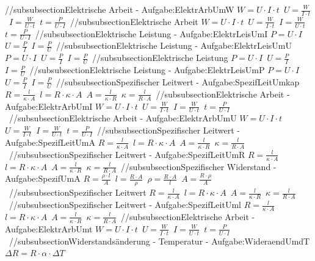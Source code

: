 //subsubsection{Elektrische Arbeit - Aufgabe:ElektrArbUmW} 
$ W = U\cdot I\cdot t $\ 
$ U = \frac{W}{I\cdot t} $\ 
$ I = \frac{W}{U\cdot t} $\ 
$ t = \frac{ P}{U\cdot I} $\ 
//subsubsection{Elektrische Arbeit} 
$ W = U\cdot I\cdot t $\ 
$ U = \frac{W}{I\cdot t} $\ 
$ I = \frac{W}{U\cdot t} $\ 
$ t = \frac{ P}{U\cdot I} $\ 
//subsubsection{Elektrische Leistung - Aufgabe:ElektrLeisUmI} 
$ P = U\cdot I $\ 
$ U = \frac{P}{I} $\ 
$ I = \frac{P}{U} $\ 
//subsubsection{Elektrische Leistung - Aufgabe:ElektrLeisUmU} 
$ P = U\cdot I $\ 
$ U = \frac{P}{I} $\ 
$ I = \frac{P}{U} $\ 
//subsubsection{Elektrische Leistung} 
$ P = U\cdot I $\ 
$ U = \frac{P}{I} $\ 
$ I = \frac{P}{U} $\ 
//subsubsection{Elektrische Leistung - Aufgabe:ElektrLeisUmP} 
$ P = U\cdot I $\ 
$ U = \frac{P}{I} $\ 
$ I = \frac{P}{U} $\ 
//subsubsection{Spezifischer Leitwert - Aufgabe:SpezifLeitUmkap} 
$ R = \frac{ l}{\kappa \cdot A} $\ 
$ l = R\cdot \kappa \cdot A $\ 
$ A = \frac{l}{\kappa \cdot R} $\ 
$ \kappa  = \frac{ l}{R\cdot A} $\ 
//subsubsection{Elektrische Arbeit - Aufgabe:ElektrArbUmI} 
$ W = U\cdot I\cdot t $\ 
$ U = \frac{W}{I\cdot t} $\ 
$ I = \frac{W}{U\cdot t} $\ 
$ t = \frac{ P}{U\cdot I} $\ 
//subsubsection{Elektrische Arbeit - Aufgabe:ElektrArbUmU} 
$ W = U\cdot I\cdot t $\ 
$ U = \frac{W}{I\cdot t} $\ 
$ I = \frac{W}{U\cdot t} $\ 
$ t = \frac{ P}{U\cdot I} $\ 
//subsubsection{Spezifischer Leitwert - Aufgabe:SpezifLeitUmA} 
$ R = \frac{ l}{\kappa \cdot A} $\ 
$ l = R\cdot \kappa \cdot A $\ 
$ A = \frac{l}{\kappa \cdot R} $\ 
$ \kappa  = \frac{ l}{R\cdot A} $\ 
//subsubsection{Spezifischer Leitwert - Aufgabe:SpezifLeitUmR} 
$ R = \frac{ l}{\kappa \cdot A} $\ 
$ l = R\cdot \kappa \cdot A $\ 
$ A = \frac{l}{\kappa \cdot R} $\ 
$ \kappa  = \frac{ l}{R\cdot A} $\ 
//subsubsection{Spezifischer Widerstand - Aufgabe:SpezifUmA} 
$ R = \frac{\rho \cdot l}{ A} $\ 
$ l = \frac{R\cdot A}{ \rho } $\ 
$ \rho  = \frac{R\cdot A}{ l} $\ 
$ A = \frac{R\cdot \rho }{ A} $\ 
//subsubsection{Spezifischer Leitwert} 
$ R = \frac{ l}{\kappa \cdot A} $\ 
$ l = R\cdot \kappa \cdot A $\ 
$ A = \frac{l}{\kappa \cdot R} $\ 
$ \kappa  = \frac{ l}{R\cdot A} $\ 
//subsubsection{Spezifischer Leitwert - Aufgabe:SpezifLeitUml} 
$ R = \frac{ l}{\kappa \cdot A} $\ 
$ l = R\cdot \kappa \cdot A $\ 
$ A = \frac{l}{\kappa \cdot R} $\ 
$ \kappa  = \frac{ l}{R\cdot A} $\ 
//subsubsection{Elektrische Arbeit - Aufgabe:ElektrArbUmt} 
$ W = U\cdot I\cdot t $\ 
$ U = \frac{W}{I\cdot t} $\ 
$ I = \frac{W}{U\cdot t} $\ 
$ t = \frac{ P}{U\cdot I} $\ 
//subsubsection{Widerstandsänderung - Temperatur - Aufgabe:WideraendUmdT} 
$ \Delta R = R\cdot \alpha \cdot \Delta T $\ 
